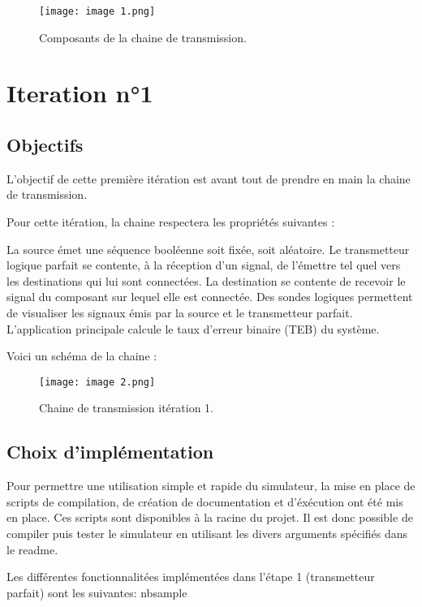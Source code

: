 \begin{figure}[H]
    \centering
    \texttt{[image: image 1.png]}
    \caption{\label{fig:image1}Composants de la chaine de transmission.}
\end{figure}

\pagebreak

\section{Iteration n°1}
\subsection{Objectifs}

L'objectif de cette première itération est avant tout de prendre en main la chaine de transmission.

Pour cette itération, la chaine respectera les propriétés suivantes :

La source émet une séquence booléenne soit fixée, soit aléatoire.
Le transmetteur logique parfait se contente, à la réception d'un signal, de l'émettre tel quel vers les destinations qui lui sont connectées.
La destination se contente de recevoir le signal du composant sur lequel elle est connectée.
Des sondes logiques permettent de visualiser les signaux émis par la source et le transmetteur parfait.
L'application principale calcule le taux d'erreur binaire (TEB) du système.

Voici un schéma de la chaine :

\begin{figure}[H]
    \centering
    \texttt{[image: image 2.png]}
    \caption{\label{fig:image2}Chaine de transmission itération 1.}
\end{figure}

\subsection{Choix d'implémentation}

Pour permettre une utilisation simple et rapide du simulateur, la mise en place de scripts de compilation, de création de documentation et d'éxécution
ont été mis en place. Ces scripts sont disponibles à la racine du projet.
Il est donc possible de compiler puis tester le simulateur en utilisant les divers arguments spécifiés dans le readme.

Les différentes fonctionnalitées implémentées dans l'étape 1 (transmetteur parfait) sont les suivantes:
nbsample


